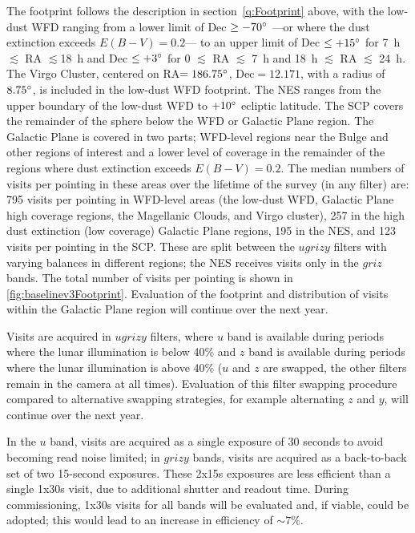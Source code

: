 \setlength\parindent{0.7cm}
\hangindent=0.7cm The footprint follows the description in section~\ref{q:Footprint} above, with the low-dust WFD ranging from a lower limit of Dec $\geq-70^{\circ}$ ---or where the dust extinction exceeds $E(B-V)=0.2$--- to an upper limit of Dec $\leq+15^{\circ}$ for 7~h $\lesssim$ RA $\lesssim$18~h and Dec $\leq+3^{\circ}$ for 0 $\lesssim$ RA $\lesssim$ 7~h and 18~h $\lesssim$ RA $\lesssim$  24~h. The Virgo Cluster, centered on RA$=186.75^{\circ}$, Dec$=12.171$\degree, with a radius of $8.75^{\circ}$, is included in the low-dust WFD footprint. The NES ranges from the upper boundary of the low-dust WFD to $+10^{\circ}$ ecliptic latitude. The SCP covers the remainder of the sphere below the WFD or Galactic Plane region. The Galactic Plane is covered in two parts; WFD-level regions near the Bulge and other regions of interest and a lower level of coverage in the remainder of the regions where dust extinction exceeds $E(B-V)=0.2$.  The median numbers of visits per pointing in these areas over the lifetime of the survey (in any filter) are: 795 visits per pointing in WFD-level areas (the low-dust WFD, Galactic Plane high coverage regions, the Magellanic Clouds, and Virgo cluster), 257 in the high dust extinction (low coverage) Galactic Plane regions, 195 in the NES, and 123 visits per pointing in the SCP. These are split between the $ugrizy$ filters with varying balances in different regions; the NES receives visits only in the $griz$ bands. The total number of visits per pointing is shown in \autoref{fig:baselinev3Footprint}. Evaluation of the footprint and distribution of visits within the Galactic Plane region will continue over the next year.

\hangindent=0.7cm Visits are acquired in $ugrizy$ filters, where $u$ band is available during periods where the lunar illumination is below 40\% and $z$ band is available during periods where the lunar illumination is above 40\% ($u$ and $z$ are swapped, the other filters remain in the camera at all times). Evaluation of this filter swapping procedure compared to alternative swapping strategies, for example alternating $z$ and $y$, will continue over the next year. 

\hangindent=0.7cm In the $u$ band, visits are acquired as a single exposure of 30 seconds to avoid becoming read noise limited; in $grizy$ bands, visits are acquired as a back-to-back set of two 15-second exposures. These 2x15s exposures are less efficient than a single 1x30s visit, due to additional shutter and readout time. During commissioning, 1x30s visits for all bands will be evaluated and, if viable, could be adopted; this would lead to an increase in efficiency of $\sim7\%$. 

